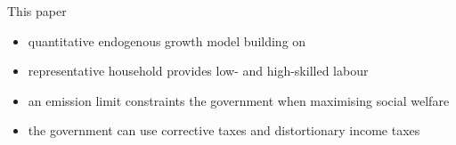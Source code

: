 \documentclass[11pt,aspectratio=169]{beamer}
\begin{document}
\begin{frame}{This paper}
\begin{itemize}
	\item<+-> quantitative \alert{endogenous growth} model building on \cite{Fried2018ClimateAnalysis}
	\vspace{3mm}
	\item<+-> representative household provides \alert{low- and high-skilled labour }
    \vspace{3mm}
	\item<+->  an \alert{emission limit constraints} the government when  \alert{maximising social welfare}
	\vspace{3mm}
	\item<+-> the government can use \alert{corrective taxes } and \alert{distortionary income taxes}
\end{itemize}
\end{frame}

\end{document}
